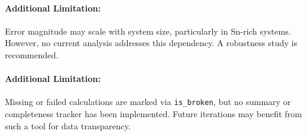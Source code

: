 \paragraph{Additional Limitation:}

Error magnitude may scale with system size, particularly in Sn-rich systems. However, no current analysis addresses this dependency. A robustness study is recommended.


\paragraph{Additional Limitation:}

Missing or failed calculations are marked via \texttt{is\_broken}, but no summary or completeness tracker has been implemented. Future iterations may benefit from such a tool for data transparency.